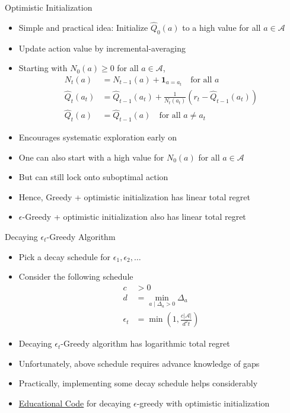\begin{frame}[shrink=10]{Optimistic Initialization}
\begin{itemize}
    \item Simple and practical idea: Initialize $\hat{Q}_0(a)$ to a high value for all
          $a \in \mathcal{A}$
    \item Update action value by incremental-averaging
    \item Starting with $N_0(a) \geq 0$ for all $a \in \mathcal{A}$,
    \begin{align*}
        N_t(a) &= N_{t-1}(a) + \mathbf{1}_{a = a_t} \quad \text{for all } a \\
        \hat{Q}_t(a_t) &= \hat{Q}_{t-1}(a_t) + \frac{1}{N_t(a_t)}\left(r_t - \hat{Q}_{t-1}(a_t)\right) \\
        \hat{Q}_t(a) &= \hat{Q}_{t-1}(a) \quad \text{for all } a \neq a_t
    \end{align*}
    \item Encourages systematic exploration early on
    \item One can also start with a high value for $N_0(a)$ for all $a \in \mathcal{A}$
    \item But can still lock onto suboptimal action
    \item Hence, Greedy + optimistic initialization has linear total regret
    \item $\epsilon$-Greedy + optimistic initialization also has linear total regret
\end{itemize}
\end{frame}

\begin{frame}{Decaying $\epsilon_t$-Greedy Algorithm}
\begin{itemize}
    \item Pick a decay schedule for $\epsilon_1, \epsilon_2, \ldots$
    \item Consider the following schedule
    \begin{align*}
        c &> 0 \\
        d &= \min_{a \mid \Delta_a > 0} \Delta_a \\
        \epsilon_t &= \min\!\left(1, \frac{c|\mathcal{A}|}{d^2 t}\right)
    \end{align*}
    \item Decaying $\epsilon_t$-Greedy algorithm has logarithmic total regret
    \item Unfortunately, above schedule requires advance knowledge of gaps
    \item Practically, implementing some decay schedule helps considerably
    \item \href{https://github.com/TikhonJelvis/RL-book/blob/master/rl/chapter14/epsilon_greedy.py}{Educational Code} for decaying $\epsilon$-greedy with optimistic initialization
\end{itemize}
\end{frame}
